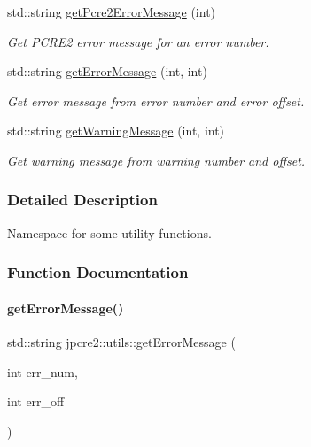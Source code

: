 \begin{DoxyCompactItemize}
std\+::string \hyperlink{namespacejpcre2_1_1utils_a6f28489b48095eeaacfaa43a0a8e87a6_a6f28489b48095eeaacfaa43a0a8e87a6}{get\+Pcre2\+Error\+Message} (int)
\begin{DoxyCompactList}\small\item\em Get P\+C\+R\+E2 error message for an error number. \end{DoxyCompactList}\item 
std\+::string \hyperlink{namespacejpcre2_1_1utils_a58db3a9ce0296d70469611445cb42209_a58db3a9ce0296d70469611445cb42209}{get\+Error\+Message} (int, int)
\begin{DoxyCompactList}\small\item\em Get error message from error number and error offset. \end{DoxyCompactList}\item 
\hypertarget{namespacejpcre2_1_1utils_a0eaae87bf8d0c58046461d4d20a7eaba}{}\label{namespacejpcre2_1_1utils_a0eaae87bf8d0c58046461d4d20a7eaba} 
std\+::string \hyperlink{namespacejpcre2_1_1utils_a0eaae87bf8d0c58046461d4d20a7eaba}{get\+Warning\+Message} (int, int)
\begin{DoxyCompactList}\small\item\em Get warning message from warning number and offset. \end{DoxyCompactList}\end{DoxyCompactItemize}


\subsubsection{Detailed Description}
Namespace for some utility functions. 

\subsubsection{Function Documentation}
\hypertarget{namespacejpcre2_1_1utils_a58db3a9ce0296d70469611445cb42209_a58db3a9ce0296d70469611445cb42209}{}\label{namespacejpcre2_1_1utils_a58db3a9ce0296d70469611445cb42209_a58db3a9ce0296d70469611445cb42209} 
\paragraph{\texorpdfstring{get\+Error\+Message()}{getErrorMessage()}}
{\footnotesize\ttfamily std\+::string jpcre2\+::utils\+::get\+Error\+Message (\begin{DoxyParamCaption}\item[{int}]{err\+\_\+num,  }\item[{int}]{err\+\_\+off }\end{DoxyParamCaption})}



